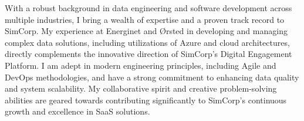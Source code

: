 
With a robust background in data engineering and software development across multiple industries, I bring a wealth of expertise and a proven track record to SimCorp.
 My experience at Energinet and Ørsted in developing and managing complex data solutions, including utilizations of Azure and cloud architectures, directly complements the innovative direction of SimCorp's Digital Engagement Platform.
 I am adept in modern engineering principles, including Agile and DevOps methodologies, and have a strong commitment to enhancing data quality and system scalability.
 My collaborative spirit and creative problem-solving abilities are geared towards contributing significantly to SimCorp's continuous growth and excellence in SaaS solutions.

